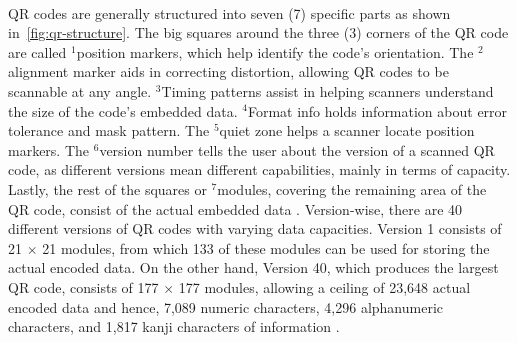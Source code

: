 \documentclass[a4paper]{scl-article}
\begin{document}
\paragraph{}QR codes are generally structured into seven (7) specific parts as shown in~\ref{fig:qr-structure}.  The big squares around the three (3) corners of the QR code are called $^1$position markers, which help identify the code’s orientation. The $^2$alignment marker aids in correcting distortion, allowing QR codes to be scannable at any angle. $^3$Timing patterns assist in helping scanners understand the size of the code’s embedded data. $^4$Format info holds information about error tolerance and mask pattern. The $^5$quiet zone helps a scanner locate position markers. The $^6$version number tells the user about the version of a scanned QR code, as different versions mean different capabilities, mainly in terms of capacity. Lastly, the rest of the squares or $^7$modules, covering the remaining area of the QR code, consist of the actual embedded data \cite{uniqode2025}. Version-wise, there are 40 different versions of QR codes with varying data capacities. Version 1 consists of 21 $\times$ 21 modules, from which 133 of these modules can be used for storing the actual encoded data. On the other hand, Version 40, which produces the largest QR code, consists of 177 $\times$ 177 modules, allowing a ceiling of 23,648 actual encoded data and hence, 7,089 numeric characters, 4,296 alphanumeric characters, and 1,817 kanji characters of information \cite{worldbank2021, steemanQR}. 
\end{document}
